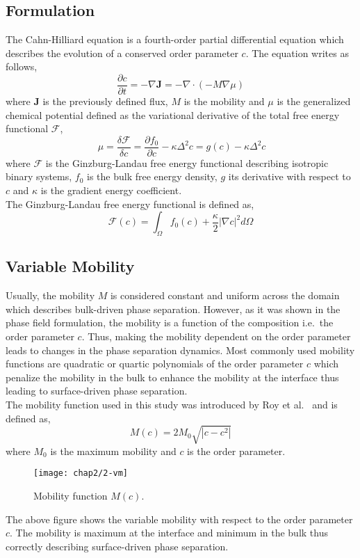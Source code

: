 \subsection{Formulation}
    The Cahn-Hilliard equation is a fourth-order partial differential equation which describes the evolution of a conserved order parameter $c$. The equation writes as follows,
    \begin{equation}\label{eq:2-ch}
        \frac{\partial c}{\partial t} = -\nabla \mathbf{J} = -\nabla \cdot \left( -M \nabla \mu \right)
    \end{equation}
    where $\mathbf{J}$ is the previously defined flux, $M$ is the mobility and $\mu$ is the generalized chemical potential defined as the variational derivative of the total free energy functional $\mathcal{F}$,
    \begin{equation}\
        \mu = \frac{\delta \mathcal{F}}{\delta c} = \frac{\partial f_0}{\partial c} - \kappa \Delta^2 c = g(c) - \kappa \Delta^2 c
    \end{equation}
    where $\mathcal{F}$ is the Ginzburg-Landau free energy functional describing isotropic binary systems, $f_0$ is the bulk free energy density, $g$ its derivative with respect to $c$ and $\kappa$ is the gradient energy coefficient.\\
    The Ginzburg-Landau free energy functional is defined as,
    \begin{equation}\label{eq:2-free-energy}
        \mathcal{F}(c) = \int_\Omega f_0(c) + \frac{\kappa}{2} |\nabla c|^2 d\Omega
    \end{equation}
\subsection{Variable Mobility}
    Usually, the mobility $M$ is considered constant and uniform across the domain which describes bulk-driven phase separation. However, as it was shown in the phase field formulation, the mobility is a function of the composition i.e.\ the order parameter $c$. Thus, making the mobility dependent on the order parameter leads to changes in the phase separation dynamics.
    Most commonly used mobility functions are quadratic or quartic polynomials of the order parameter $c$ which penalize the mobility in the bulk to enhance the mobility at the interface thus leading to surface-driven phase separation.\\
    The mobility function used in this study was introduced by Roy et al.\ \cite{RoyVarmaGururajan2021} and is defined as,
    \begin{equation}
        M(c) = 2M_0 \sqrt{|c - c^2|}
    \end{equation}
    where $M_0$ is the maximum mobility and $c$ is the order parameter.
    \begin{figure}[H]
        \centering
        \texttt{[image: chap2/2-vm]}
        \caption{Mobility function $M(c)$.}
        \label{fig:2-mobility}
    \end{figure}
    The above figure shows the variable mobility with respect to the order parameter $c$. The mobility is maximum at the interface and minimum in the bulk thus correctly describing surface-driven phase separation.
